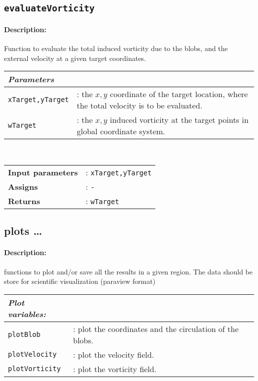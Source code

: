 \subsection{\texttt{evaluateVorticity}}
	\paragraph{Description:} Function to evaluate the total induced vorticity due to the blobs, and the external velocity at a given target coordinates.\\
	
	    \begin{tabular}{lp{10cm}}
			\textit{Parameters} & \\ \hline
			 \texttt{xTarget,yTarget} &: the $x,y$ coordinate of the target location, where the total velocity is to be evaluated.\\
			\texttt{wTarget} &: the $x,y$ induced vorticity at the target points in global coordinate system.\\
		\end{tabular} \vspace{5 mm}
	\\		
	\begin{tabular}{lp{10cm}}
		\textbf{Input parameters} &: \texttt{xTarget,yTarget}\\ 
		\textbf{Assigns} &: \texttt{-}\\ 			
		\textbf{Returns} &: \texttt{wTarget}\\ 					
	\end{tabular}


		
\subsection{plots \ldots}
	\paragraph{Description:} functions to plot and/or save all the results in a given region. The data should be store for scientific visualization (paraview format)\\
	
		\begin{tabular}{lp{10cm}}
			\textit{Plot variables:} & \\ \hline
			\texttt{plotBlob} &: plot the coordinates and the circulation of the blobs.\\
			\texttt{plotVelocity} &: plot the velocity field.\\ 
			\texttt{plotVorticity} &: plot the vorticity field.\\ 
		\end{tabular} \vspace{5 mm}
		

